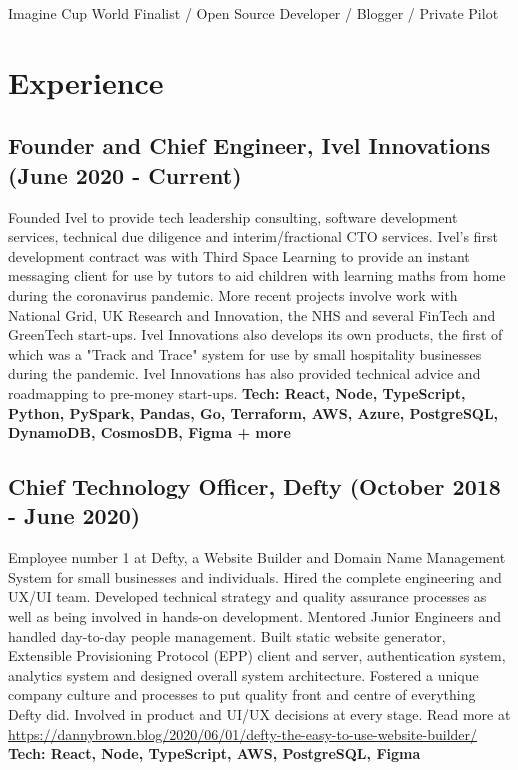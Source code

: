 \documentclass[10pt,letterpaper]{article}
\begin{document}

	\noindent Imagine Cup World Finalist / Open Source Developer / Blogger / Private Pilot

	\noindent\makebox[\linewidth]{\rule{\textwidth}{0.4pt}}
	
	\section*{Experience}
	\subsection*{Founder and Chief Engineer, Ivel Innovations \small{(June 2020 - Current)}}
	Founded Ivel to provide tech leadership consulting, software development services, technical due diligence and interim/fractional CTO services. Ivel's first development contract was with Third Space Learning to provide an instant messaging client for use by tutors to aid children with learning maths from home during the coronavirus pandemic. More recent projects involve work with National Grid, UK Research and Innovation, the NHS and several FinTech and GreenTech start-ups. Ivel Innovations also develops its own products, the first of which was a "Track and Trace" system for use by small hospitality businesses during the pandemic. Ivel Innovations has also provided technical advice and roadmapping to pre-money start-ups. 
	\textbf{Tech: React, Node, TypeScript, Python, PySpark, Pandas, Go, Terraform, AWS, Azure, PostgreSQL, DynamoDB, CosmosDB, Figma + more} 
	
	\subsection*{Chief Technology Officer, Defty \small{(October 2018 - June 2020)}}
	Employee number 1 at Defty, a Website Builder and Domain Name Management System for small businesses and individuals. 
	Hired the complete engineering and UX/UI team. Developed technical strategy and quality assurance processes as well as being involved in hands-on development. Mentored Junior Engineers and handled day-to-day people management. Built static website generator, Extensible Provisioning Protocol (EPP) client and server, authentication system, analytics system and designed overall system architecture. Fostered a unique company culture and processes to put quality front and centre of everything Defty did. Involved in product and UI/UX decisions at every stage. Read more at \href{https://dannybrown.blog/2020/06/01/defty-the-easy-to-use-website-builder/}{https://dannybrown.blog/2020/06/01/defty-the-easy-to-use-website-builder/}
		\textbf{Tech: React, Node, TypeScript, AWS, PostgreSQL, Figma} 
	
\end{document}
